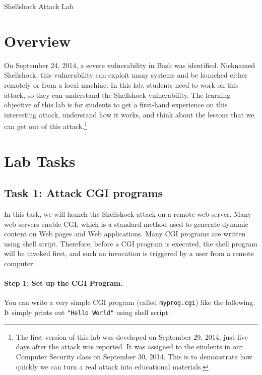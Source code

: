 




\begin{center}
{\LARGE Shellshock Attack Lab}
\end{center}
\copyrightnoticeA

\section{Overview}

On September 24, 2014, a severe vulnerability in Bash was identified.
Nicknamed Shellshock, this vulnerability can exploit many systems and be
launched either remotely or from a local machine.  In this
lab, students need to work on this attack, so they can understand the
Shellshock vulnerability. The learning objective of this lab is for students to get a
first-hand experience on this interesting attack, understand how it
works, and think about the lessons that we can get out of this
attack.\footnote{The first version of this lab was developed on September 29, 2014, 
just five days after the attack was reported. It was assigned to the students 
in our Computer Security class on September 30, 2014. This is to
demonstrate how quickly we can turn a real attack into educational
materials.}  


\section{Lab Tasks}

\subsection{Task 1: Attack CGI programs}

In this task, we will launch the Shellshock attack on a remote web server. 
Many web servers enable CGI, which is a standard method used to generate 
dynamic content on Web pages and Web applications. Many CGI programs are 
written using shell script. Therefore, before a CGI program is executed,
the shell program will be invoked first, and such an invocation is
triggered by a user from a remote computer. 


\paragraph{Step 1: Set up the CGI Program.} You can write a very simple CGI 
program (called {\tt myprog.cgi}) like the
following. It simply prints out {\tt "Hello World"} using shell script.


